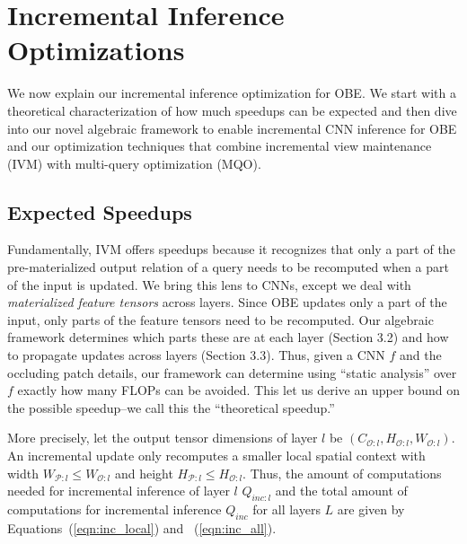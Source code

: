 \section{Incremental Inference Optimizations}\label{sec:exact}
We now explain our incremental inference optimization for OBE. We start with a theoretical characterization of how much speedups can be expected and then dive into our novel algebraic framework to enable incremental CNN inference for OBE and our optimization techniques that combine incremental view maintenance (IVM) with multi-query optimization (MQO).\\


\subsection{Expected Speedups}
Fundamentally, IVM offers speedups because it recognizes that only a part of the pre-materialized output relation of a query needs to be recomputed when a part of the input is updated. We bring this lens to CNNs, except we deal with \textit{materialized feature tensors} across layers. Since OBE updates only a part of the input, only parts of the feature tensors need to be recomputed. Our algebraic framework determines which parts these are at each layer (Section 3.2) and how to propagate updates across layers (Section 3.3). Thus, given a CNN $f$ and the occluding patch details, our framework can determine using ``static analysis'' over $f$ exactly how many FLOPs can be avoided. This let us derive an upper bound on the possible speedup--we call this the ``theoretical speedup.''

More precisely, let the output tensor dimensions of layer $l$ be $(C_{\mathcal{O}:l} , H_{\mathcal{O}:l} , W_{\mathcal{O}:l})$. An incremental update only recomputes a smaller local spatial context with width $W_{\mathcal{P}:l} \le W_{\mathcal{O}:l}$ and height $H_{\mathcal{P}:l} \le H_{\mathcal{O}:l}$.
Thus, the amount of computations needed for incremental inference of layer $l$ $Q_{inc:l}$ and the total amount of computations for incremental inference $Q_{inc}$ for all layers $L$ are given by Equations~(\ref{eqn:inc_local}) and ~(\ref{eqn:inc_all}).

